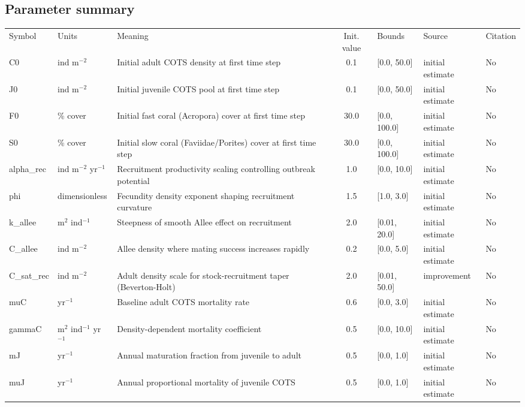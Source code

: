 \begin{landscape}
\subsection*{Parameter summary}
\begin{table}[ht]
\centering
\scriptsize
\setlength{\tabcolsep}{4pt}
\begin{tabularx}{1.0\linewidth}{l p{3cm} p{7cm} c l l l}
\toprule
Symbol & Units & Meaning & Init. value & Bounds & Source & Citation \\
C0 & ind m$^{-2}$ & Initial adult COTS density at first time step & 0.1 & [0.0, 50.0] & initial estimate & No \\
J0 & ind m$^{-2}$ & Initial juvenile COTS pool at first time step & 0.1 & [0.0, 50.0] & initial estimate & No \\
F0 & \% cover & Initial fast coral (Acropora) cover at first time step & 30.0 & [0.0, 100.0] & initial estimate & No \\
S0 & \% cover & Initial slow coral (Faviidae/Porites) cover at first time step & 30.0 & [0.0, 100.0] & initial estimate & No \\
alpha\_rec & ind m$^{-2}$ yr$^{-1}$ & Recruitment productivity scaling controlling outbreak potential & 1.0 & [0.0, 10.0] & initial estimate & No \\
phi & dimensionless & Fecundity density exponent shaping recruitment curvature & 1.5 & [1.0, 3.0] & initial estimate & No \\
k\_allee & m$^{2}$ ind$^{-1}$ & Steepness of smooth Allee effect on recruitment & 2.0 & [0.01, 20.0] & initial estimate & No \\
C\_allee & ind m$^{-2}$ & Allee density where mating success increases rapidly & 0.2 & [0.0, 5.0] & initial estimate & No \\
C\_sat\_rec & ind m$^{-2}$ & Adult density scale for stock-recruitment taper (Beverton-Holt) & 2.0 & [0.01, 50.0] & improvement & No \\
muC & yr$^{-1}$ & Baseline adult COTS mortality rate & 0.6 & [0.0, 3.0] & initial estimate & No \\
gammaC & m$^{2}$ ind$^{-1}$ yr$^{-1}$ & Density-dependent mortality coefficient & 0.5 & [0.0, 10.0] & initial estimate & No \\
mJ & yr$^{-1}$ & Annual maturation fraction from juvenile to adult & 0.5 & [0.0, 1.0] & initial estimate & No \\
muJ & yr$^{-1}$ & Annual proportional mortality of juvenile COTS & 0.5 & [0.0, 1.0] & initial estimate & No \\

\end{tabularx}
\end{table}
\end{landscape}
